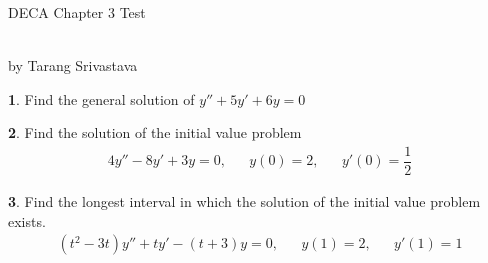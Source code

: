\documentclass[11pt]{article}
\author{Tarang Srivastava}
\newcommand{\makechaptertitle}[1]{
\begin{center}
	\begin{large}
		DECA Chapter #1 Test
	\end{large}
	\begin{small}
		\\by Tarang Srivastava
	\end{small}
\end{center}
}
\theoremstyle{definition}
\newtheorem{q}{}
\begin{document}
	\begin{multicols*}{2}
		\makechaptertitle{3}
		\begin{q}
			Find the general solution of $y'' + 5y' + 6y = 0$
		\end{q}
		\begin{q}
			Find the solution of the initial value problem  
			\begin{align*}
				4y'' - 8y' + 3y = 0, && y(0)=2, && y'(0)=\dfrac{1}{2}
			\end{align*}
		\end{q}
		\begin{q}
			Find the longest interval in which the solution of the initial value problem exists.
			\begin{align*}
			(t^2-3t)y'' + ty' - (t+3)y = 0, && y(1)=2, && y'(1)=1
			\end{align*}
		\end{q}
	\end{multicols*}
\end{document}
